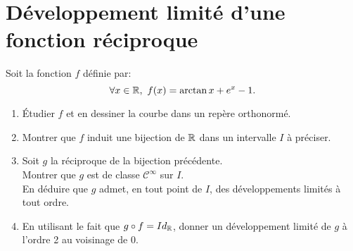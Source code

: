 \documentclass[a4paper, 11pt,reqno]{article}
\begin{document}
\noindent\section{\large{D\'eveloppement limit\'e d'une fonction r\'eciproque}}

\begin{exercice}  \;
	Soit la fonction $f$ d\'efinie par:
	$$\forall x\in\R,\ f(x)=\arctan{x}+e^x-1.$$
	\begin{enumerate}
		\item \'Etudier $f$ et en dessiner la courbe dans un rep\`ere orthonorm\'e.
		\item Montrer que $f$ induit une bijection de $\mathbb{R}$ dans un intervalle $I$ \`a pr\'eciser.
		\item Soit $g$ la r\'eciproque de la bijection pr\'ec\'edente.\\
		      \noindent Montrer que $g$ est de classe $\mathcal{C}^{\infty}$ sur $I$.\\
		      \noindent En d\'eduire que $g$ admet, en tout point de $I$, des d\'eveloppements limit\'es \`a tout ordre.
		\item En utilisant le fait que $g\circ f=Id_{\mathbb{R}}$, donner un d\'eveloppement limit\'e de $g$ \`a l'ordre 2 au voisinage de 0.
	\end{enumerate}
\end{exercice}
\end{document}
